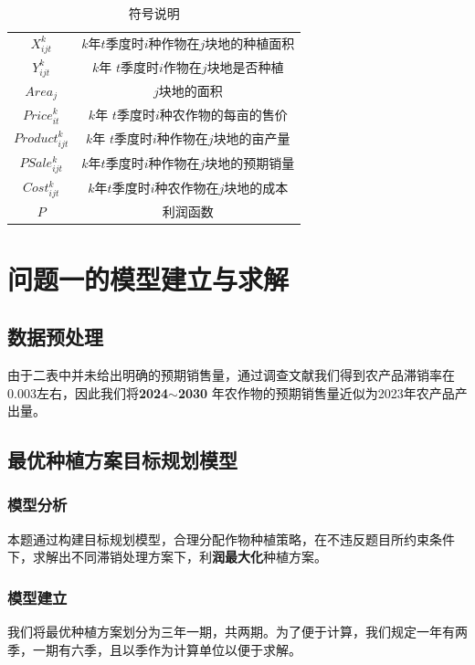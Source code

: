 \documentclass[withoutpreface,bwprint]{cumcmthesis} %
\begin{document}
\begin{table}[H]
		\caption{符号说明}\label{tab:001} \centering
	\begin{tabular}{cc}
		\toprule[1.5pt]
		$X_{ijt}^{k}$ & $k$年$t\text{季度时}i\text{种作物在}j\text{块地的种植面积}$ \\ $Y_{ijt}^{k}$&$k$年 $t\text{季度时}i\text{作物在}j\text{块地是否种植}$ \\
		$Area_j$ &$ j\text{块地的面积}$\\ $Price_{it}^{k}$&$k$年 $t\text{季度时}i\text{种农作物的每亩的售价}$\\
		$Product_{ijt}^{k}$ &$k$年 $t\text{季度时}i\text{种作物在}j\text{块地的亩产量}$ \\ $PSale_{ijt}^{k}$& $k$年$t\text{季度时}i\text{种作物在}j\text{块地的预期销量}$\\
		$Cost_{ijt}^{k}$ &$k$年$ t\text{季度时}i\text{种农作物在}j\text{块地的成本}$ \\$P$ & 利润函数 \\
		\bottomrule[1.5pt]
	\end{tabular}
\end{table}

\section{问题一的模型建立与求解}
\subsection{数据预处理}
由于二表中并未给出明确的预期销售量，通过调查文献我们得到农产品滞销率在0.003左右，因此我们将\textbf{2024$\sim$2030} 年农作物的预期销售量近似为2023年农产品产出量。
\subsection{最优种植方案目标规划模型}
\subsubsection{模型分析}
本题通过构建目标规划模型，合理分配作物种植策略，在不违反题目所约束条件下，求解出不同滞销处理方案下，利\textbf{润最大化}种植方案。
\subsubsection{模型建立}
我们将最优种植方案划分为三年一期，共两期。为了便于计算，我们规定一年有两季，一期有六季，且以季作为计算单位以便于求解。
\end{document}
